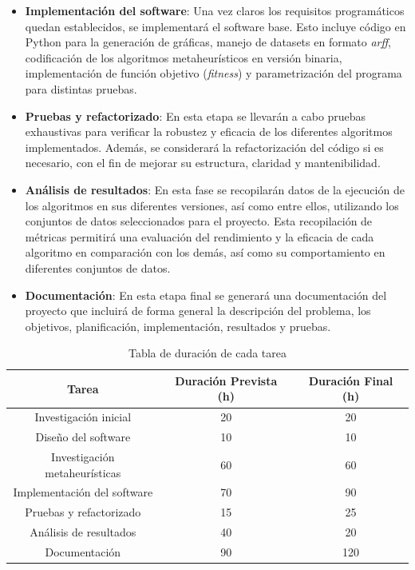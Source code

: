 \begin{itemize}
      \item \textbf{Implementación del software}: Una vez claros los requisitos programáticos quedan establecidos, se implementará el software base. Esto incluye código en Python para la generación de gráficas, manejo de datasets en formato \textit{arff}, codificación de los algoritmos metaheurísticos en versión binaria, implementación de función objetivo (\textit{fitness}) y parametrización del programa para distintas pruebas.
      \item \textbf{Pruebas y refactorizado}: En esta etapa se llevarán a cabo pruebas exhaustivas para verificar la robustez y eficacia de los diferentes algoritmos implementados. Además, se considerará la refactorización del código si es necesario, con el fin de mejorar su estructura, claridad y mantenibilidad.
      \item \textbf{Análisis de resultados}: En esta fase se recopilarán datos de la ejecución de los algoritmos en sus diferentes versiones, así como entre ellos, utilizando los conjuntos de datos seleccionados para el proyecto. Esta recopilación de métricas permitirá una evaluación del rendimiento y la eficacia de cada algoritmo en comparación con los demás, así como su comportamiento en diferentes conjuntos de datos.
      \item \textbf{Documentación}: En esta etapa final se generará una documentación del proyecto que incluirá de forma general la descripción del problema, los objetivos, planificación, implementación, resultados y pruebas.
\end{itemize}

\begin{table}[htp]
      \centering
      \begin{tabular}{c|c|c}
            Tarea                         & Duración Prevista (h) & Duración Final (h) \\ \hline
            Investigación inicial         & 20                    & 20                 \\
            Diseño del software           & 10                    & 10                 \\
            Investigación metaheurísticas & 60                    & 60                 \\
            Implementación del software   & 70                    & 90                 \\
            Pruebas y refactorizado       & 15                    & 25                 \\
            Análisis de resultados        & 40                    & 20                 \\
            Documentación                 & 90                    & 120                \\ \hline
      \end{tabular}
      \caption{Tabla de duración de cada tarea}
\end{table}

